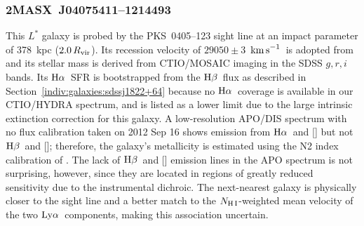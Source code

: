 \documentclass[twocolumn,twocolappendix,tighten,times]{aastex6}
\newcommand{\NII}{\ion{N}{2}}
\newcommand{\OIII}{\ion{O}{3}}
\newcommand{\Ha}{\ensuremath{{\rm H}\alpha}}
\newcommand{\Hb}{\ensuremath{{\rm H}\beta}}
\newcommand{\kms}{\ensuremath{{\rm km\,s}^{-1}}}
\newcommand{\lya}{\ensuremath{{\rm Ly}\alpha}}
\begin{document}



\subsubsection{2MASX~J04075411--1214493}
\label{indiv:galaxies:2masxj0407-12}

This $L^*$ galaxy is probed by the PKS~0405--123 sight line at an impact 
parameter of 378~kpc ($2.0\,R_{\rm vir}$). Its recession velocity of 
$29050\pm3$~\kms\ is adopted from \citet{johnson13} and its stellar mass is 
derived from CTIO/MOSAIC imaging in the SDSS $g,r,i$ bands. Its \Ha\ SFR is 
bootstrapped from the \Hb\ flux as described in 
Section~\ref{indiv:galaxies:sdssj1822+64} because no \Ha\ coverage is 
available in our CTIO/HYDRA spectrum, and is listed as a lower limit due 
to the large intrinsic extinction correction for this galaxy. A low-resolution
APO/DIS spectrum with no flux calibration taken on 2012 Sep 16 shows emission 
from \Ha\ and [\NII] but not \Hb\ and [\OIII]; therefore, the 
galaxy's metallicity is estimated using the N2 index calibration of 
\citet{pettini04}. The lack of \Hb\ and [\OIII] emission lines in 
the APO spectrum is not surprising, however, since they are located in regions 
of greatly reduced sensitivity due to the instrumental dichroic. The next-nearest
galaxy is physically closer to the sight line and a better match to the 
$N_{\rm H\,I}$-weighted mean velocity of the two \lya\ components, making this 
association uncertain.
\end{document}
